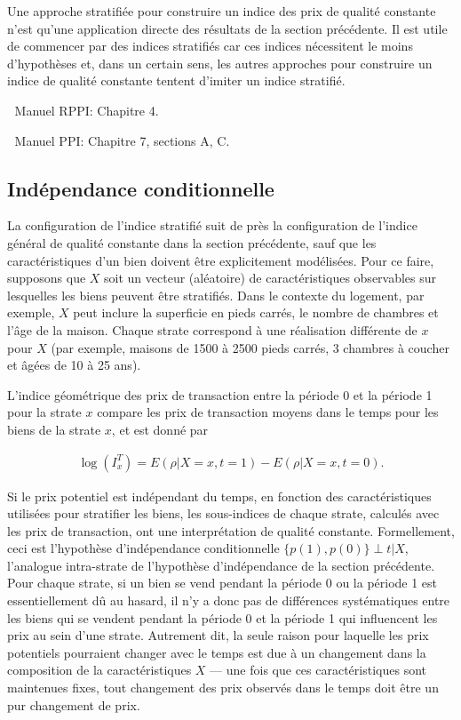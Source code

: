 \documentclass[
]{article}
\begin{document}
Une approche stratifiée pour construire un indice des prix de qualité constante n'est qu'une application directe des résultats de la section précédente. Il est utile de commencer par des indices stratifiés car ces indices nécessitent le moins d'hypothèses et, dans un certain sens, les autres approches pour construire un indice de qualité constante tentent d'imiter un indice stratifié.

📖 Manuel RPPI: Chapitre 4.

📖 Manuel PPI: Chapitre 7, sections A, C.

\hypertarget{induxe9pendance-conditionnelle}{%
\subsection{Indépendance conditionnelle}\label{induxe9pendance-conditionnelle}}

La configuration de l'indice stratifié suit de près la configuration de l'indice général de qualité constante dans la section précédente, sauf que les caractéristiques d'un bien doivent être explicitement modélisées. Pour ce faire, supposons que \(X\) soit un vecteur (aléatoire) de caractéristiques observables sur lesquelles les biens peuvent être stratifiés. Dans le contexte du logement, par exemple, \(X\) peut inclure la superficie en pieds carrés, le nombre de chambres et l'âge de la maison. Chaque strate correspond à une réalisation différente de \(x\) pour \(X\) (par exemple, maisons de 1500 à 2500 pieds carrés, 3 chambres à coucher et âgées de 10 à 25 ans).

L'indice géométrique des prix de transaction entre la période 0 et la période 1 pour la strate \(x\) compare les prix de transaction moyens dans le temps pour les biens de la strate \(x\), et est donné par

\begin{align*}
\log (I^{T}_{x}) = E(\rho | X = x, t = 1) - E(\rho | X = x, t = 0).
\end{align*}

Si le prix potentiel est indépendant du temps, en fonction des caractéristiques utilisées pour stratifier les biens, les sous-indices de chaque strate, calculés avec les prix de transaction, ont une interprétation de qualité constante. Formellement, ceci est l'hypothèse d'indépendance conditionnelle \(\{p(1), p(0)\} \perp t | X\), l'analogue intra-strate de l'hypothèse d'indépendance de la section précédente. Pour chaque strate, si un bien se vend pendant la période 0 ou la période 1 est essentiellement dû au hasard, il n'y a donc pas de différences systématiques entre les biens qui se vendent pendant la période 0 et la période 1 qui influencent les prix au sein d'une strate. Autrement dit, la seule raison pour laquelle les prix potentiels pourraient changer avec le temps est due à un changement dans la composition de la caractéristiques \(X\) --- une fois que ces caractéristiques sont maintenues fixes, tout changement des prix observés dans le temps doit être un pur changement de prix.
\end{document}
